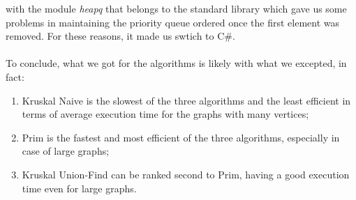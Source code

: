 with the module \textit{heapq} that belongs to the standard library which gave us some problems in 
maintaining the priority queue ordered once the first element was removed. For these reasons, it made us 
swtich to C\#. \\
\\
\noindent
To conclude, what we got for the algorithms is likely with what we excepted, in fact:
\begin{enumerate}
    \item Kruskal Naive is the slowest of the three algorithms and the least efficient in terms of average 
    execution time for the graphs with many vertices;
    \item Prim is the fastest and most efficient of the three algorithms, especially in case of large graphs;
    \item Kruskal Union-Find can be ranked second to Prim, having a good execution time even for large graphs.
\end{enumerate} 